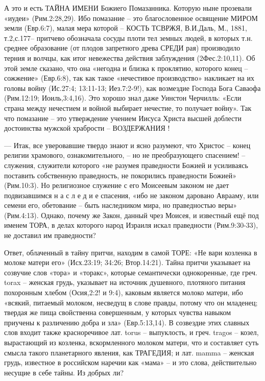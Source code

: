      А это и есть ТАЙНА  ИМЕНИ  Божиего Помазанника. Которую ныне прозевали «иудеи» (Рим.2:28,29).
Ибо помазание – это благословенное освящение МИРОМ земли (Евр.6:7), малая мера которой – КОСТЬ {ТСВРЖЯ, В.И.Даль, М., 1881, т.2,с.177}– притчево обозначала сосуды плоти тел земных людей, в которых т.н. среднее образование (от плодов запретного древа СРЕДИ рая) производило терния и волчцы, как итог невежества действия заблуждения (2Фес.2:10,11).  Об этой земле сказано, что она  «негодна и близка к проклятию, которого конец – сожжение» (Евр.6:8), так как такое «нечестивое производство» накликает на их головы войну (Ис.27:4; 13:11-13;  Иез.7:2-9!), как возмездие Господа Бога Саваофа (Рим.12:19; Иоиль,3:4,16). Это хорошо знал даже Уинстон Черчилль: «Если страна между нечестием и войной выбирает нечестие, то получает войну». Так что помазание – это утверждение учением Иисуса Христа высшей доблести достоинства мужской храбрости – ВОЗДЕРЖАНИЯ !

    — Итак, все уверовавшие твердо знают и ясно разумеют, что Христос – конец религии храмового, ознакомительного, – но не преобразующего спасением! – служения, служители которого «не разумея праведности Божией и усиливаясь поставить собственную праведность, не покорились праведности Божией» (Рим.10:3). Но религиозное служение с его Моисеевым законом не дает подвизавшимся  н а с л е д и е  спасения, «ибо не законом даровано Аврааму, или семени его, обетование – быть наследником мира, но праведностью веры» (Рим.4:13).  Однако, почему же Закон, данный чрез Моисея, и известный ещё под именем ТОРА, в делах которого народ Израиля искал праведности (Рим.9:30-33), не доставил им праведности?

      Ответ, облаченный в тайну притчи, находим в самой ТОРЕ: «Не вари козленка в молоке матери его» (Исх.23:19; 34:26; Втор.14:21). Тайна притчи указывает на созвучие слов «тора» и «торакс», которые семантически однокоренные, где греч. torax – женская грудь, указывает на источник душевного, плотяного питания похоронным хлебом (Осия,2:2! и 9:4), каковым является молоко матери, ибо «всякий, питаемый молоком, несведущ в слове правды, потому что он младенец; твердая же пища свойственна совершенным, у которых чувства навыком приучены к различению добра и зла» (Евр.5:13,14). В созвездие этих славных слов входит также красноречивое лат. torus – выпуклость, и греч. tragos – козел, вырастающий из козленка, вскормленного молоком матери, что и составляет суть смысла такого планетарного явления, как  ТРАГЕДИЯ;  и лат. mamma – женская грудь, известное в российском наречии как «мама» – и это слова, действительно несущие в себе тайны.   Из добрых ли?

